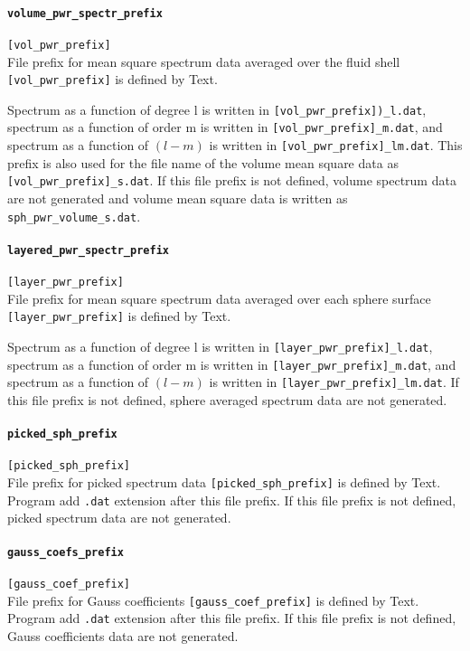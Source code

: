\paragraph{\tt volume\_pwr\_spectr\_prefix}
\label{href_t:volume_pwr_spectr_prefix}
\verb|[vol_pwr_prefix]| \\
File prefix for mean square spectrum data averaged over the fluid shell \verb|[vol_pwr_prefix]| is defined by Text. 

Spectrum as a function of degree {l} is written in \verb|[vol_pwr_prefix])_l.dat|, spectrum as a function of order {m} is written in \verb|[vol_pwr_prefix]_m.dat|, and spectrum as a function of $(l-m)$ is written in \verb|[vol_pwr_prefix]_lm.dat|. This prefix is also used for the file name of the volume mean square data as \verb|[vol_pwr_prefix]_s.dat|.
If this file prefix is not defined, volume spectrum data are not generated and volume mean square data is written as \verb|sph_pwr_volume_s.dat|.

\paragraph{\tt layered\_pwr\_spectr\_prefix}
\label{href_t:layered_pwr_spectr_prefix}
\verb|[layer_pwr_prefix]| \\
File prefix for mean square spectrum data averaged over each sphere surface \verb|[layer_pwr_prefix]| is defined by Text.

Spectrum as a function of degree {l} is written in \verb|[layer_pwr_prefix]_l.dat|, spectrum as a function of order {m} is written in \verb|[layer_pwr_prefix]_m.dat|, and spectrum as a function of $(l-m)$ is written in \verb|[layer_pwr_prefix]_lm.dat|. If this file prefix is not defined, sphere averaged spectrum data are not generated. 

\paragraph{\tt picked\_sph\_prefix}
\label{href_t:picked_sph_prefix}
\verb|[picked_sph_prefix]| \\
File prefix for picked spectrum data \verb|[picked_sph_prefix]| is defined by Text. Program add {\tt .dat} extension after this file prefix. If this file prefix is not defined, picked spectrum data are not generated. 

\paragraph{\tt gauss\_coefs\_prefix}
\label{href_t:gauss_coefs_prefix}
\verb|[gauss_coef_prefix]| \\
File prefix for Gauss coefficients \verb|[gauss_coef_prefix]| is defined by Text. Program add {\tt .dat} extension after this file prefix. If this file prefix is not defined, Gauss coefficients data are not generated. 


